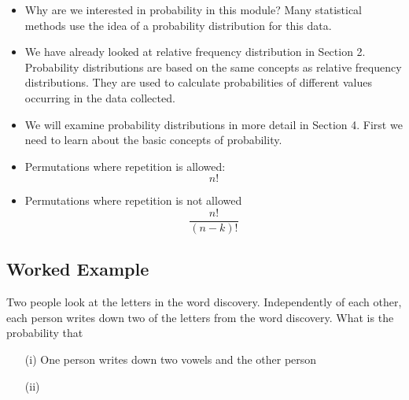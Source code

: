 \documentclass[]{report}
\begin{document}
{{\begin{itemize}
\item Why are we interested in probability in this module? Many statistical methods use the idea of a probability distribution for this data.
\end{itemize}

\begin{itemize}
\item We have already looked at relative frequency distribution in Section 2. Probability distributions are based on the same concepts as relative frequency distributions. They are used to calculate probabilities of different values occurring in the data collected.

\item We will examine probability distributions in more detail in Section 4. First we need to learn about the basic concepts of probability.
\end{itemize}

}

{ 





{ 






\begin{itemize}
\item Permutations where repetition is allowed: 
\[ n! \]
\item Permutations where repetition is not allowed
\[ \frac{n!}{(n-k)!} \]
\end{itemize}




\subsection*{Worked Example}
Two people look at the letters in the word discovery. Independently of each other, each person writes down two of the letters from the word discovery.
What is the probability that
\begin{itemize}
\item[(i)] One person writes down two vowels and the other person 
\item[(ii)]
\end{itemize}

}}}
\end{document}
